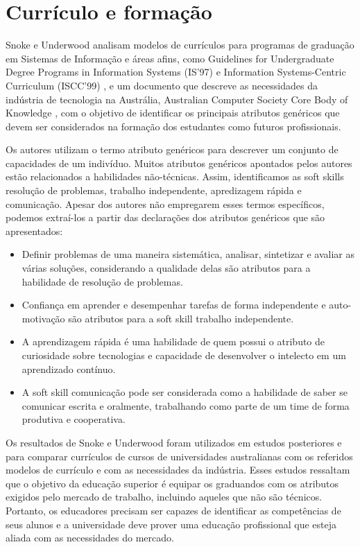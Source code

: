\section{Currículo e formação}
\label{sec:curriculos}

Snoke e Underwood \cite{snoke:01} analisam modelos de currículos para programas de graduação em Sistemas de Informação e áreas afins,
como  Guidelines for Undergraduate Degree Programs in Information Systems (IS’97) \cite{is97}
e     Information Systems-Centric Curriculum (ISCC'99) \cite{iscc99},
e um documento que descreve as necessidades da indústria de tecnologia na Austrália,
Australian Computer Society Core Body of Knowledge \cite{acs},
com o objetivo de identificar os principais atributos genéricos que devem ser considerados na formação dos estudantes como futuros profissionais.

Os autores utilizam o termo atributo genéricos para descrever um conjunto de capacidades de um indivíduo. Muitos atributos genéricos apontados pelos autores estão relacionados a habilidades não-técnicas. Assim, identificamos as soft skills resolução de problemas, trabalho independente, apredizagem rápida e comunicação. Apesar dos autores não empregarem esses termos específicos, podemos extraí-los a partir das declarações dos atributos genéricos que são apresentados:

\begin{itemize}
	\item Definir problemas de uma maneira sistemática, analisar, sintetizar e avaliar as várias soluções, considerando a qualidade delas são atributos para a habilidade de resolução de problemas.
	\item Confiança em aprender e desempenhar tarefas de forma independente e auto-motivação são atributos para a soft skill trabalho independente.
	\item	A aprendizagem rápida é uma habilidade de quem possui o atributo de curiosidade sobre tecnologias e capacidade de desenvolver o intelecto em um aprendizado contínuo.
	\item	A soft skill comunicação pode ser considerada como a habilidade de saber se comunicar escrita e oralmente, trabalhando como parte de um time de forma produtiva e cooperativa.
\end{itemize}

Os resultados de Snoke e Underwood \cite{snoke:01} foram utilizados em estudos posteriores \cite{snoke:02} e \cite{snoke:03} para comparar currículos de cursos de universidades australianas com os referidos modelos de currículo e com as necessidades da indústria. 
Esses estudos ressaltam que o objetivo da educação superior é equipar os graduandos com os atributos exigidos pelo mercado de trabalho, incluindo aqueles que não são técnicos. Portanto, os educadores precisam ser capazes de identificar as competências de seus alunos e a universidade deve prover uma educação profissional que esteja aliada com as necessidades do mercado.

